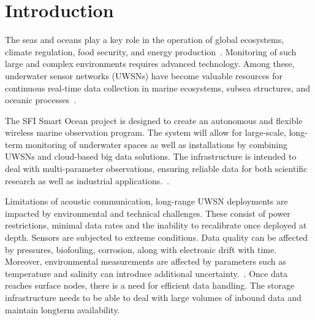 




\chapter{Introduction}
\label{chap:introduction}

The seas and oceans play a key role in the operation of global ecosystems,
climate
regulation, food security, and energy production~\cite{CopernicusFoodSecurity}.
Monitoring of such large and complex environments requires advanced technology.
Among these, underwater sensor networks (UWSNs) have become valuable resources
for continuous real-time data collection in marine ecosystems, subsea
structures, and oceanic processes~\cite{Domingos2024}.

The SFI Smart Ocean project is designed to create an autonomous and flexible
wireless marine observation program. The system will allow for large-scale,
long-term monitoring of underwater spaces as well as installations by combining
UWSNs and cloud-based big data solutions.
The infrastructure is intended to deal with multi-parameter observations,
ensuring reliable data for both scientific research as well as industrial
applications.~\cite{SmartOceanProject,SmartOceanSite}.

Limitations of acoustic communication, long-range UWSN
deployments are impacted by environmental and
technical challenges.
These consist of power restrictions, minimal data rates and the
inability to recalibrate once deployed at depth. Sensors are subjected to
extreme conditions. Data quality can be affected by pressures, biofouling,
corrosion, along with electronic drift with time. Moreover, environmental
measurements are affected by parameters such as temperature and salinity
can introduce additional uncertainty.~\cite{Skalvik2023}. Once data reaches
surface nodes, there is a need for efficient data handling.
The storage infrastructure needs to be able to deal with large volumes of
inbound data and maintain longterm availability.

